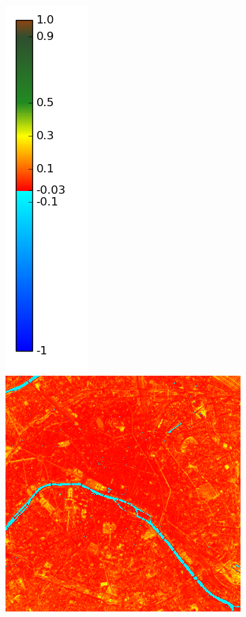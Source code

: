 \documentclass{book}
\begin{document}
\begin{figure}[H]
{\includegraphics[scale=0.2]{images/colormap.png}
\includegraphics[scale=0.25]{images/Paris/11_ndvi.png}
}
\end{figure}
\end{document}
